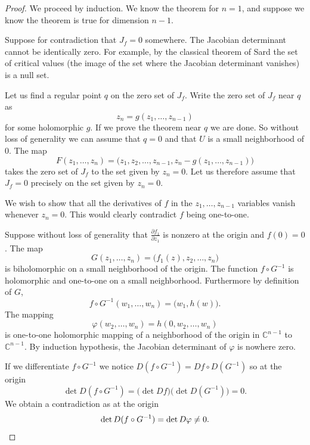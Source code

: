 \documentclass[12pt,openany]{book}
\newcommand{\C}{{\mathbb{C}}}
\theoremstyle{plain}
\theoremstyle{remark}
\theoremstyle{definition}
\theoremstyle{exercise}
\theoremstyle{example}
\begin{document}
\begin{proof}
We proceed by induction.  We know the theorem for $n=1$,
and suppose we know the theorem is true for dimension $n-1$.

Suppose for contradiction that $J_f = 0$ somewhere.
The Jacobian determinant cannot be identically zero.  For example, by the
classical theorem of Sard the set of critical values (the image of the set
where the Jacobian determinant vanishes) is a null set.

Let us find a regular point $q$ on the zero set of $J_f$.
Write the zero set of $J_f$ near $q$ as
\begin{equation*}
z_n = g(z_1,\ldots,z_{n-1})
\end{equation*}
for some holomorphic $g$.
If we prove the theorem near $q$ we are done.  So without loss of generality
we can assume that $q=0$ and that $U$ is a
small neighborhood of $0$.  The map
\begin{equation*}
F(z_1,\ldots,z_n) = \bigl(z_1,z_2,\ldots,z_{n-1},z_n-g(z_1,\ldots,z_{n-1}) \bigr)
\end{equation*}
takes the zero set of $J_f$ to the set given by $z_n=0$.  Let us therefore assume
that $J_f = 0$ precisely on the set given by $z_n=0$.

We wish to show that all the derivatives of $f$ in the $z_1,\ldots,z_{n-1}$
variables vanish whenever $z_n = 0$.  This
would clearly contradict $f$ being one-to-one.

Suppose without loss of generality that $\frac{\partial f_1}{\partial z_1}$
is nonzero at the origin and $f(0) = 0$.
The map
\begin{equation*}
G(z_1,\ldots,z_n) = \bigl(f_1(z),z_2,\ldots,z_n)
\end{equation*}
is biholomorphic on a small neighborhood of the origin.
The function $f \circ G^{-1}$ is holomorphic and one-to-one on a small
neighborhood.  Furthermore by definition of $G$,
\begin{equation*}
f \circ G^{-1} (w_1,\ldots,w_n) = \bigl(w_1,h(w)\bigr) .
\end{equation*}
The mapping
\begin{equation*}
\varphi(w_2,\ldots,w_n) = h(0,w_2,\ldots,w_n)
\end{equation*}
is one-to-one holomorphic mapping of a neighborhood of the origin in
$\C^{n-1}$ to $\C^{n-1}$.  By induction hypothesis, the Jacobian determinant of
$\varphi$ is nowhere zero.

If we differentiate $f \circ G^{-1}$ we notice 
$D(f \circ G^{-1}) = Df \circ D(G^{-1})$
so at the origin
\begin{equation*}
\det D(f \circ G^{-1}) = \bigl(\det Df\bigr) \bigl(\det D(G^{-1})\bigr) = 0.
\end{equation*}
We obtain a contradiction as at the origin
\begin{equation*}
\det 
D(f \circ G^{-1})
= \det D\varphi \not= 0 . \qedhere
\end{equation*}
\end{proof}
\end{document}

